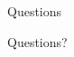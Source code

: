 \documentclass[10pt]{beamer}
\begin{document}
\begin{frame}{Questions}
\begin{center}
\Huge Questions?
\end{center}
\end{frame}




\end{document}
